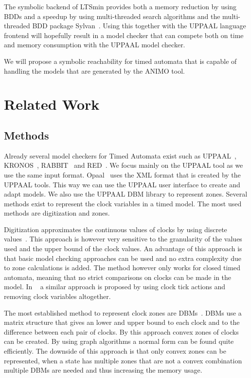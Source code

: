 \documentclass[11pt]{article}
\begin{document}
The symbolic backend of LTSmin provides both a memory reduction by using BDDs and a speedup by using multi-threaded search algorithms and the multi-threaded BDD package Sylvan~\cite{sylvan}. Using this together with the UPPAAL language frontend will hopefully result in a model checker that can compete both on time and memory consumption with the UPPAAL model checker.

We will propose a symbolic reachability for timed automata that is capable of handling the models that are generated by the ANIMO tool.

\section{Related Work}
\subsection{Methods}
Already several model checkers for Timed Automata exist such as UPPAAL~\cite{UPPAAL}, KRONOS~\cite{kronos}, RABBIT~\cite{CAV03} and RED~\cite{crds}. We focus mainly on the UPPAAL tool as we use the same input format. Opaal~\cite{opaal} uses the XML format that is created by the UPPAAL tools. This way we can use the UPPAAL user interface to create and adapt models. We also use the UPPAAL DBM library to represent zones. Several methods exist to represent the clock variables in a timed model. The most used methods are digitization and zones. 

Digitization approximates the continuous values of clocks by using discrete values~\cite{CHARME01}. This approach is however very sensitive to the granularity of the values used and the upper bound of the clock values. An advantage of this approach is that basic model checking approaches can be used and no extra complexity due to zone calculations is added. The method however only works for closed timed automata, meaning that no strict comparisons on clocks can be made in the model. In ~\cite{nguyen2012discrete} a similar approach is proposed by using clock tick actions and removing clock variables altogether. 

The most established method to represent clock zones are DBMs~\cite{dbmorig, bengtsson2002clocks}. DBMs use a matrix structure that gives an lower and upper bound to each clock and to the difference between each pair of clocks. By this approach convex zones of clocks can be created. By using graph algorithms a normal form can be found quite efficiently. The downside of this approach is that only convex zones can be represented, when a state has multiple zones that are not a convex combination multiple DBMs are needed and thus increasing the memory usage. 
\end{document}
